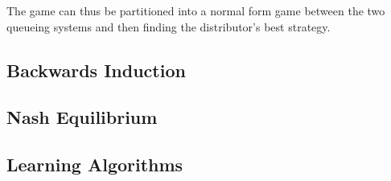 The game can thus be partitioned into a normal form game between the
two queueing systems and then finding the distributor's best strategy. 

\subsection{Backwards Induction}

\subsection{Nash Equilibrium}

\subsection{Learning Algorithms}
